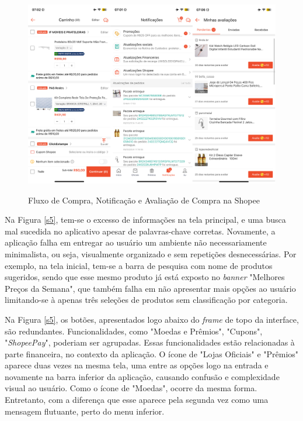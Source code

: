 \begin{figure}[ht]
    \centering
    \caption{Fluxo de Compra, Notificação e Avaliação de Compra na Shopee}
    \includegraphics[keepaspectratio=true,scale=0.2]{figuras/shopee4.PNG}
    \label{s4}
\end{figure}

Na Figura \ref{s5}, tem-se o excesso de informações na tela principal, e uma busca mal sucedida no aplicativo apesar de palavras-chave corretas. Novamente, a aplicação falha em entregar ao usuário um ambiente não necessariamente minimalista, ou seja, visualmente organizado e sem repetições desnecessárias. Por exemplo, na tela inicial, tem-se a barra de pesquisa com nome de produtos sugeridos, sendo que esse mesmo produto já está exposto no \textit{banner} "Melhores Preços da Semana", que também falha em não apresentar mais opções ao usuário limitando-se à apenas três seleções de produtos sem classificação por categoria.

Na Figura \ref{s5}, os botões, apresentados logo abaixo do \textit{frame} de topo da interface, são redundantes. Funcionalidades, como "Moedas e Prêmios", "Cupons", "\textit{ShopeePay}", poderiam ser agrupadas. Essas funcionalidades estão relacionadas à parte financeira, no contexto da aplicação. O ícone de "Lojas Oficiais" e "Prêmios" aparece duas vezes na mesma tela, uma entre as opções logo na entrada e novamente na barra inferior da aplicação, causando confusão e complexidade visual ao usuário. Como o ícone de "Moedas", ocorre da mesma forma. Entretanto, com a diferença que esse aparece pela segunda vez como uma mensagem flutuante, perto do menu inferior.


